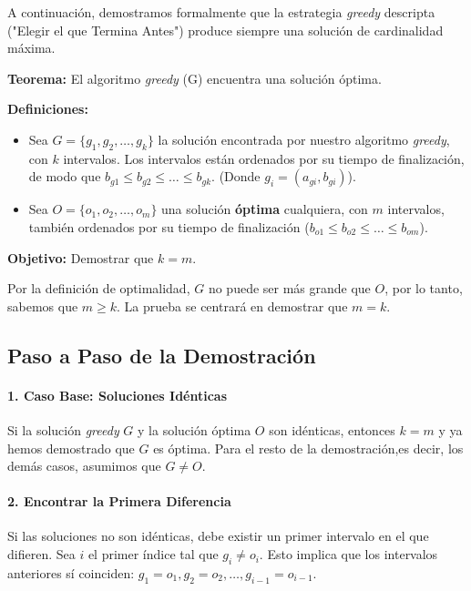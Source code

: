 \documentclass[12pt, a4paper]{article}
\begin{document}
A continuación, demostramos formalmente que la estrategia \textit{greedy} descripta 
("Elegir el que Termina Antes") produce siempre una solución de cardinalidad máxima.

\textbf{Teorema:} El algoritmo \textit{greedy} (G) encuentra una solución óptima.

\textbf{Definiciones:}
\begin{itemize}
    \item Sea $G = \{g_1, g_2, \dots, g_k\}$ la solución encontrada por nuestro algoritmo 
    \textit{greedy}, con $k$ intervalos. Los intervalos están ordenados por su tiempo de finalización, 
    de modo que $b_{g1} \le b_{g2} \le \dots \le b_{gk}$. (Donde $g_i = (a_{gi}, b_{gi})$).
    \item Sea $O = \{o_1, o_2, \dots, o_m\}$ una solución \textbf{óptima} cualquiera, con $m$ intervalos, 
    también ordenados por su tiempo de finalización ($b_{o1} \le b_{o2} \le \dots \le b_{om}$).
\end{itemize}

\textbf{Objetivo:} Demostrar que $k = m$.

Por la definición de optimalidad, $G$ no puede ser más grande que $O$, por lo tanto, sabemos que $m \ge k$. La prueba se centrará en demostrar que $m=k$.

\subsection{Paso a Paso de la Demostración}

\paragraph{1. Caso Base: Soluciones Idénticas}
Si la solución \textit{greedy} $G$ y la solución óptima $O$ son idénticas, entonces $k = m$ y 
ya hemos demostrado que $G$ es óptima. Para el resto de la demostración,es decir, los demás casos, 
asumimos que $G \neq O$.

\paragraph{2. Encontrar la Primera Diferencia}
Si las soluciones no son idénticas, debe existir un primer intervalo en el que difieren. 
Sea $i$ el primer índice tal que $g_i \neq o_i$.
Esto implica que los intervalos anteriores sí coinciden: $g_1 = o_1, g_2 = o_2, \dots, g_{i-1} = o_{i-1}$.
\end{document}
